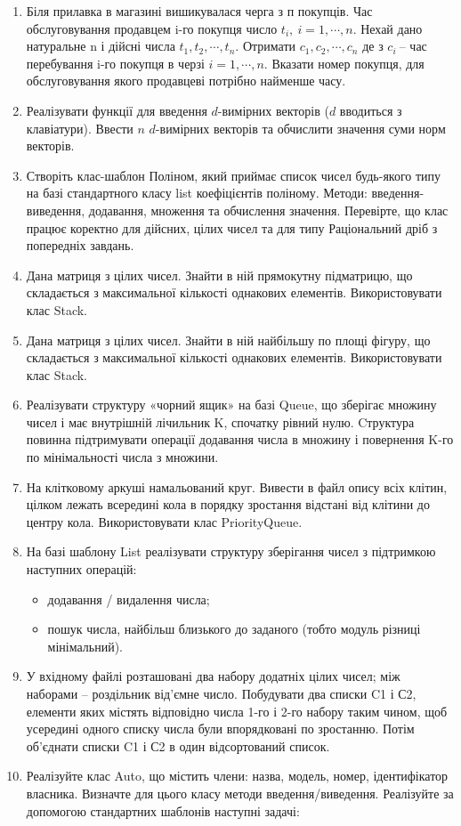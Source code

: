 \documentclass[]{article}
\begin{document}
\begin{enumerate}
\def\labelenumi{\arabic{enumi}.}
\item
  Біля прилавка в магазині вишикувалася черга з п покупців. Час
  обслуговування продавцем i-го покупця число
  \(t_{i},\ i = 1,\cdots,n\). Нехай дано натуральне n і дійсні числа
  \(t_{1},t_{2},\cdots,t_{n}\). Отримати \(c_{1},c_{2},\cdots,c_{n}\) де
  з \(c_{i}\ \)-- час перебування i-го покупця в черзі
  \(i = 1,\cdots,n\). Вказати номер покупця, для обслуговування якого
  продавцеві потрібно найменше часу.
\item
  Реалізувати функції для введення \(d\)-вимірних векторів (\(d\)
  вводиться з клавіатури). Ввести \(n\) \(d\)-вимірних векторів та
  обчислити значення суми норм векторів.
\item
  Створіть клас-шаблон Поліном, який приймає список чисел будь-якого
  типу на базі стандартного класу list коефіцієнтів поліному. Методи:
  введення-виведення, додавання, множення та обчислення значення.
  Перевірте, що клас працює коректно для дійсних, цілих чисел та для
  типу Раціональний дріб з попередніх завдань.
\item
  Дана матриця з цілих чисел. Знайти в ній прямокутну підматрицю, що
  складається з максимальної кількості однакових елементів.
  Використовувати клас Stack.
\item
  Дана матриця з цілих чисел. Знайти в ній найбільшу по площі фігуру, що
  складається з максимальної кількості однакових елементів.
  Використовувати клас Stack.
\item
  Реалізувати структуру «чорний ящик» на базі Queue, що зберігає множину
  чисел і має внутрішній лічильник K, спочатку рівний нулю. Cтруктура
  повинна підтримувати операції додавання числа в множину і повернення
  K-го по мінімальності числа з множини.
\item
  На клітковому аркуші намальований круг. Вивести в файл опису всіх
  клітин, цілком лежать всередині кола в порядку зростання відстані від
  клітини до центру кола. Використовувати клас PriorityQueue.
\item
  На базі шаблону List реалізувати структуру зберігання чисел з
  підтримкою наступних операцій:

  \begin{itemize}
  \item
    додавання / видалення числа;
  \item
    пошук числа, найбільш близького до заданого (тобто модуль різниці
    мінімальний).
  \end{itemize}
\item
  У вхідному файлі розташовані два набору додатніх цілих чисел; між
  наборами -- роздільник від'ємне число. Побудувати два списки C1 і С2,
  елементи яких містять відповідно числа 1-го і 2-го набору таким чином,
  щоб усередині одного списку числа були впорядковані по зростанню.
  Потім об'єднати списки C1 і С2 в один відсортований список.
\item
  Реалізуйте клас Auto, що містить члени: назва, модель, номер,
  ідентифікатор власника. Визначте для цього класу методи
  введення/виведення. Реалізуйте за допомогою стандартних шаблонів
  наступні задачі:


\end{enumerate}
\end{document}
